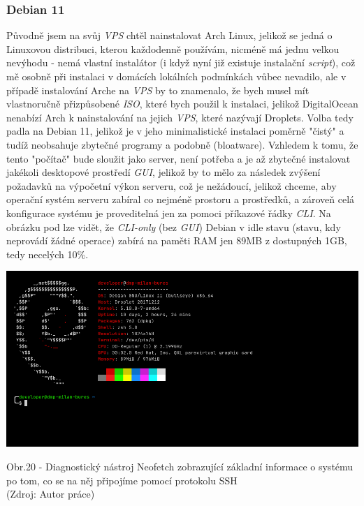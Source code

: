 \documentclass[12pt,a4paper]{report}
\begin{document}
  \subsubsection{Debian 11}
  Původně jsem na svůj \emph{VPS} chtěl nainstalovat Arch Linux, jelikož se jedná o Linuxovou distribuci, kterou každodenně používám, nicméně má jednu velkou
  nevýhodu - nemá vlastní instalátor (i když nyní již existuje instalační \emph{script}), což mě osobně při
  instalaci v domácích lokálních podmínkách vůbec nevadilo, ale v případě instalování Arche na \emph{VPS}
  by to znamenalo, že bych musel mít vlastnoručně přizpůsobené \emph{ISO}, které bych použil k instalaci,
  jelikož DigitalOcean nenabízí Arch k nainstalování na jejich \emph{VPS}, které nazývají Droplets.
  Volba tedy padla na Debian 11, jelikož je v jeho minimalistické instalaci poměrně "čistý" \space a tudíž
  neobsahuje zbytečné programy a podobně (bloatware). Vzhledem k tomu, že tento "počítač" \space bude
  sloužit jako server, není potřeba a je až zbytečné instalovat jakékoli desktopové prostředí \emph{GUI},
  jelikož by to mělo za následek zvýšení požadavků na výpočetní
  výkon serveru, což je nežádoucí, jelikož chceme, aby operační systém serveru zabíral co nejméně
  prostoru a prostředků, a zároveň celá konfigurace systému je proveditelná jen za pomoci
  příkazové řádky \emph{CLI}. Na obrázku pod lze vidět, že \emph{CLI-only} (bez \emph{GUI}) Debian v idle
  stavu (stavu, kdy neprovádí žádné operace) zabírá na paměti RAM jen 89MB z dostupných 1GB,
  tedy necelých 10\%.

  \vspace*{0.5cm}
  \noindent\includegraphics[width=\linewidth]{VPS.png}
  \begin{center}
    Obr.20 -  Diagnostický nástroj Neofetch zobrazující základní informace o systému po tom, co se na něj připojíme pomocí protokolu SSH  \\
    (Zdroj: Autor práce)
  \end{center}
  \vspace*{0.5cm}
\end{document}

